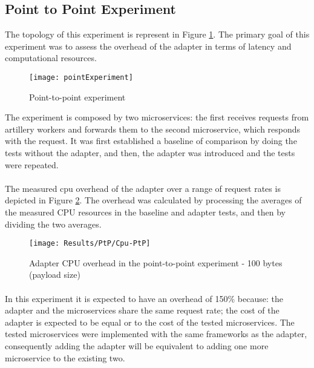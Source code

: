 \subsection{Point to Point Experiment}

The topology of this experiment is represent in Figure \ref{fig:point}.
The primary goal of this experiment was to assess the overhead of the adapter in terms of latency and computational resources.

\begin{figure}[htbp]
    \centering
    \texttt{[image: pointExperiment]}
    \caption{Point-to-point experiment}
    \label{fig:point}
\end{figure}

The experiment is composed by two microservices:
the first receives requests from artillery workers and forwards them to the second microservice, which responds with the request.
It was first established a baseline of comparison
by doing the tests without the adapter, and then, the adapter was introduced and the tests were repeated.

\paragraph{}

The measured cpu overhead of the adapter over a
range of request rates is depicted in Figure \ref{fig:cpuPtp}.
The overhead was calculated by processing the averages of the measured CPU resources in the baseline and adapter tests, and then by dividing the two averages.

\begin{figure}[htbp]
    \centering
    \texttt{[image: Results/PtP/Cpu-PtP]}
    \caption{Adapter CPU overhead in the point-to-point experiment - 100 bytes (payload size)}
    \label{fig:cpuPtp}
\end{figure}

\paragraph{}

In this experiment it is expected to have an overhead of 150\% because: the adapter and the microservices share the same request rate;
the cost of the adapter is expected to be equal or to the cost of the tested microservices.
The tested microservices were implemented with the same frameworks as the adapter, consequently adding the adapter will be equivalent to adding one more microservice to the existing two.

